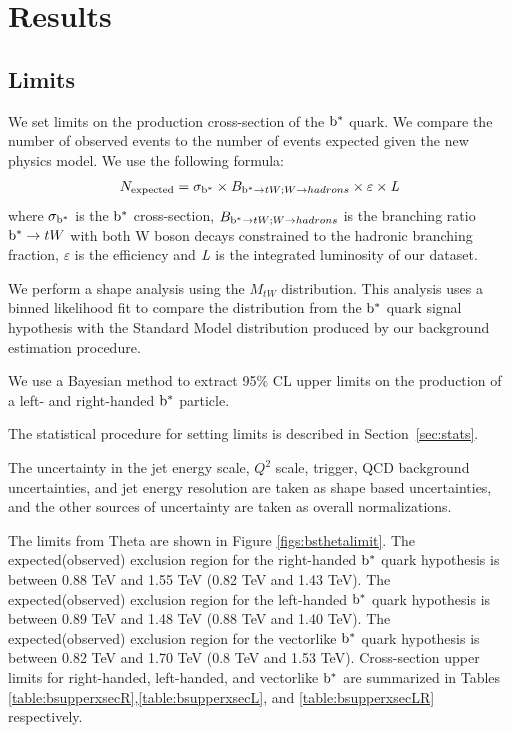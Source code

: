 \clearpage
\newpage
\chapter{Results}
\section{Limits}
\label{sec:bsstats}
We set limits on the production cross-section of 
the $\mathrm{b}^{*}$ quark. We compare the number 
of observed events to the number of events expected given the new physics model. We use the following formula:
\begin{eqnarray}
N_{\textrm{expected}} = \sigma_{\mathrm{b}^{*}} \times B_{\mathrm{b}^{*} \rightarrow tW;W \to hadrons} \times \varepsilon \times \emph{L}
\end{eqnarray}
where $\sigma_{\mathrm{b}^{*}}$ is the $\mathrm{b}^{*}$ cross-section, $B_{\mathrm{b}^{*} \rightarrow tW;W \to hadrons}$ is the branching ratio 
$\mathrm{b}^{*} \to tW$ with both W boson decays constrained to the hadronic branching fraction, $\varepsilon$ is the efficiency and $\emph{L}$ is the integrated luminosity of our dataset. 

We perform a shape analysis using the $M_{tW}$ distribution.  This analysis uses a binned likelihood fit to compare the distribution from the $\mathrm{b}^{*}$ quark signal 
hypothesis with the Standard Model distribution produced by our background estimation procedure.  

\label{sec:bsTheta}
We use a Bayesian method to extract 95\% CL upper limits 
on the production of a left- and right-handed $\mathrm{b}^{*}$ particle.  

The statistical procedure for setting limits is described in Section~\ref{sec:stats}. 

The uncertainty in the jet energy scale, $Q^2$ scale, trigger, QCD background uncertainties, and jet energy resolution are taken 
as shape based uncertainties, and the other sources of uncertainty are taken as overall normalizations.  

The limits from Theta are shown in Figure \ref{figs:bsthetalimit}.  
The expected(observed) exclusion region for the right-handed $\mathrm{b}^{*}$ quark hypothesis is between 0.88 TeV and 1.55 TeV (0.82 TeV and 1.43 TeV).  
The expected(observed) exclusion region for the left-handed $\mathrm{b}^{*}$ quark hypothesis is between 0.89 TeV and 1.48 TeV (0.88 TeV and 1.40 TeV).  
The expected(observed) exclusion region for the vectorlike $\mathrm{b}^{*}$ quark hypothesis is between 0.82 TeV and 1.70 TeV (0.8 TeV and 1.53 TeV).  Cross-section upper limits for 
right-handed, left-handed, and vectorlike $\mathrm{b}^{*}$ are summarized in Tables \ref{table:bsupperxsecR},\ref{table:bsupperxsecL}, and \ref{table:bsupperxsecLR} respectively. 

